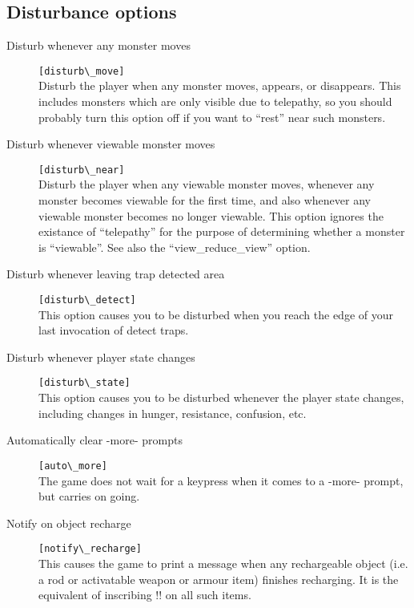 \subsection{Disturbance options}
\begin{description}
\item[Disturb whenever any monster moves] \verb+[disturb\_move]+\\
    Disturb the player when any monster moves, appears, or disappears.
    This includes monsters which are only visible due to telepathy, so
    you should probably turn this option off if you want to ``rest'' near
    such monsters.

\item[Disturb whenever viewable monster moves] \verb+[disturb\_near]+\\
    Disturb the player when any viewable monster moves, whenever any
    monster becomes viewable for the first time, and also whenever any
    viewable monster becomes no longer viewable. This option ignores
    the existance of ``telepathy'' for the purpose of determining whether
    a monster is ``viewable''. See also the ``view\_reduce\_view'' option.

\item[Disturb whenever leaving trap detected area]
\verb+[disturb\_detect]+\\
    This option causes you to be disturbed when you reach the edge of your
    last invocation of detect traps.

\item[Disturb whenever player state changes] \verb+[disturb\_state]+\\
    This option causes you to be disturbed whenever the player state
    changes, including changes in hunger, resistance, confusion, etc.

\item[Automatically clear -more- prompts] \verb+[auto\_more]+\\
    The game does not wait for a keypress when it comes to a -more-
    prompt, but carries on going.

\item[Notify on object recharge] \verb+[notify\_recharge]+\\
    This causes the game to print a message when any rechargeable object
    (i.e. a rod or activatable weapon or armour item) finishes recharging.
    It is the equivalent of inscribing {!!} on all such items.
\end{description}

